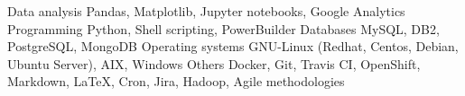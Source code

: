%
%
%

    \begin{keywords}
        \keywordsentry
            {Data analysis}
            {
                Pandas,
                Matplotlib,
                Jupyter notebooks,
                Google Analytics
            }
        \keywordsentry
            {Programming}
            {
                Python,
                Shell scripting,
                PowerBuilder
            }
        \keywordsentry
            {Databases}
            {
                MySQL,
                DB2,
                PostgreSQL,
                MongoDB
            }
        \keywordsentry
            {Operating systems}
            {
                GNU-Linux (Redhat, Centos, Debian, Ubuntu Server),
                AIX,
                Windows
            }
        \keywordsentry
            {Others}
            {
            	Docker,
                Git,
                Travis CI,
                OpenShift,
                Markdown,
                \LaTeX,
                Cron,
                Jira,
                Hadoop,
                Agile methodologies
            }
    \end{keywords}
